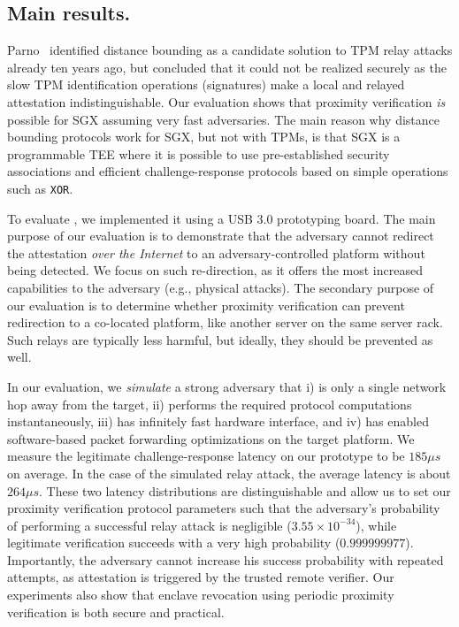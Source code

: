 \subsection{Main results.} Parno~\cite{parno2008bootstrapping} identified distance bounding as a candidate solution to TPM relay attacks already ten years ago, but concluded that it could not be realized securely as the slow TPM identification operations (signatures) make a local and relayed attestation indistinguishable. Our evaluation shows that proximity verification \emph{is} possible for SGX assuming very fast adversaries. The main reason why distance bounding protocols work for SGX, but not with TPMs, is that SGX is a programmable TEE where it is possible to use pre-established security associations and efficient challenge-response protocols based on simple operations such as \texttt{XOR}.

To evaluate \name, we implemented it using a USB 3.0 prototyping board. The main purpose of our evaluation is to demonstrate that the adversary cannot redirect the attestation \emph{over the Internet} to an adversary-controlled platform without being detected. We focus on such re-direction, as it offers the most increased capabilities to the adversary (e.g., physical attacks). The secondary purpose of our evaluation is to determine whether proximity verification can prevent redirection to a co-located platform, like another server on the same server rack. Such relays are typically less harmful, but ideally, they should be prevented as well.




In our evaluation, we \emph{simulate} a strong adversary that i) is only a single network hop away from the target, ii) performs the required protocol computations instantaneously, iii) has infinitely fast hardware interface, and iv) has enabled software-based packet forwarding optimizations on the target platform. We measure the legitimate challenge-response latency on our prototype to be $185 \mu s$ on average. In the case of the simulated relay attack, the average latency is about $264 \mu s$. These two latency distributions are distinguishable and allow us to set our proximity verification protocol parameters such that the adversary's probability of performing a successful relay attack is negligible ($3.55\times 10^{-34}$), while legitimate verification succeeds with a very high probability ($0.999999977$). Importantly, the adversary cannot increase his success probability with repeated attempts, as attestation is triggered by the trusted remote verifier. Our experiments also show that enclave revocation using periodic proximity verification is both secure and practical.


